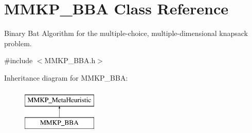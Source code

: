 \hypertarget{class_m_m_k_p___b_b_a}{\section{M\+M\+K\+P\+\_\+\+B\+B\+A Class Reference}
\label{class_m_m_k_p___b_b_a}
}


Binary Bat Algorithm for the multiple-\/choice, multiple-\/dimensional knapsack problem.  




{\ttfamily \#include $<$M\+M\+K\+P\+\_\+\+B\+B\+A.\+h$>$}

Inheritance diagram for M\+M\+K\+P\+\_\+\+B\+B\+A\+:\begin{figure}[H]
\begin{center}
\leavevmode
\includegraphics[height=2.000000cm]{class_m_m_k_p___b_b_a}
\end{center}
\end{figure}
